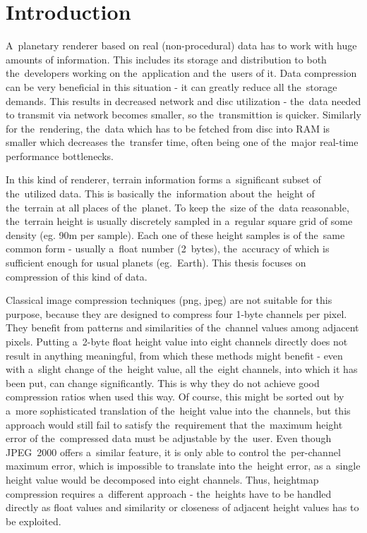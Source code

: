 \chapter*{Introduction}\label{chap:introduction}

A~planetary renderer based on real (non-procedural) data has to work with huge amounts of information. This includes its storage and distribution to both the~developers working on the~application and the~users of it. Data compression can be very beneficial in this situation - it can greatly reduce all the~storage demands. This results in decreased network and disc utilization - the~data needed to transmit via network becomes smaller, so the~transmittion is quicker. Similarly for the~rendering, the~data which has to be fetched from disc into RAM is smaller which decreases the~transfer time, often being one of the~major real-time performance bottlenecks. 

In this kind of renderer, terrain information forms a~significant subset of the~utilized data. This is basically the~information about the~height of the~terrain at all places of the~planet. To keep the~size of the~data reasonable, the~terrain height is usually discretely sampled in a~regular square grid of some density (eg. 90m per sample). Each one of these height samples is of the~same common form - usually a~float number (2~bytes), the~accuracy of which is sufficient enough for usual planets (eg.~Earth). This thesis focuses on compression of this kind of data. 

Classical image compression techniques (png, jpeg) are not suitable for this purpose, because they are designed to compress four 1-byte channels per pixel. They benefit from patterns and similarities of the~channel values among adjacent pixels. Putting a~2-byte float height value into eight channels directly does not result in anything meaningful, from which these methods might benefit -  even with a~slight change of the~height value, all the~eight channels, into which it has been put, can change significantly. This is why they do not achieve good compression ratios when used this way. Of course, this might be sorted out by a~more sophisticated translation of the~height value into the~channels, but this approach would still fail to satisfy the~requirement that the~maximum height error of the~compressed data must be adjustable by the~user. Even though JPEG~2000 offers a~similar feature, it is only able to control the~per-channel maximum error, which is impossible to translate into the~height error, as a~single height value would be decomposed into eight channels. Thus, heightmap compression requires a~different approach - the~heights have to be handled directly as float values and similarity or closeness of adjacent height values has to be exploited.

